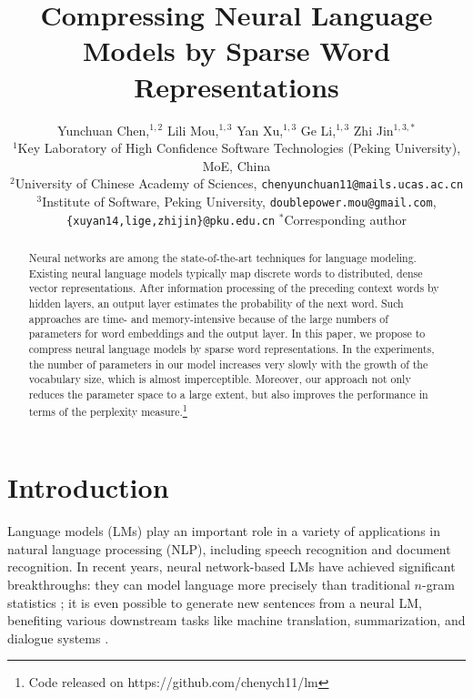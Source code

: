 \documentclass[11pt]{article}
\title{Compressing Neural Language Models by Sparse Word Representations}
\author{Yunchuan Chen,$^{1,2}$ Lili Mou,$^{1,3}$ Yan Xu,$^{1,3}$ Ge Li,$^{1,3}$ Zhi Jin$^{1,3,*}$\\
	$^1$Key Laboratory of High Confidence Software Technologies (Peking University), MoE, China\\
	$^2$University of Chinese Academy of Sciences, \texttt{chenyunchuan11@mails.ucas.ac.cn}\\
	$^3$Institute of Software, Peking University, \texttt{doublepower.mou@gmail.com},\\
	\texttt{\{xuyan14,lige,zhijin\}@pku.edu.cn}
	\quad $^*$Corresponding author%
}
\date{}
\begin{document}

\maketitle
\renewcommand{\headrulewidth}{0pt}
\thispagestyle{fancy}

\begin{abstract}
Neural networks are among the state-of-the-art techniques for language modeling. Existing neural language models typically map discrete words to distributed, dense vector representations. After information processing of the preceding context words by hidden layers, an output layer estimates the probability of the next word. Such approaches are time- and memory-intensive because of the large numbers of parameters for word embeddings and the output layer. In this paper, we propose to compress neural language models by sparse word representations. In the experiments, the number of parameters in our model increases very slowly with the growth of the vocabulary size, which is almost imperceptible. Moreover, our approach not only reduces the parameter space to a large extent, but also improves the performance in terms of the perplexity measure.\footnote{Code released on https://github.com/chenych11/lm}
\end{abstract}


\section{Introduction}\label{sec:intro}

Language models (LMs) play an important role in a variety of applications in natural language processing (NLP), including speech recognition and document recognition. In recent years, neural network-based LMs have achieved significant breakthroughs: they can model language more precisely than traditional $n$-gram statistics \cite{Mikolov:2011hq}; it is even possible to generate new sentences from a neural LM, benefiting various downstream tasks like machine translation, summarization, and dialogue systems \cite{Devlin:2014uh,rushneural,conversation,bf}.
\end{document}
